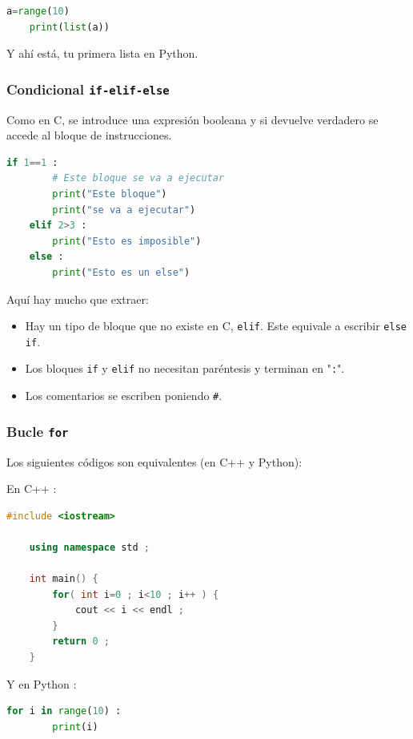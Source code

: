 \documentclass[openany,a4paper]{book}
\begin{document}
\begin{lstlisting}[language=Python]
    a=range(10)
    print(list(a))
\end{lstlisting}

Y ahí está, tu primera lista en Python.

\subsubsection{Condicional \texttt{if-elif-else}}

Como en C, se introduce una expresión booleana y si devuelve verdadero se accede al bloque de instrucciones.

\begin{lstlisting}[language=Python]
    if 1==1 :
        # Este bloque se va a ejecutar
        print("Este bloque")
        print("se va a ejecutar")
    elif 2>3 :
        print("Esto es imposible")
    else :
        print("Esto es un else")
\end{lstlisting}

Aquí hay mucho que extraer:
\begin{itemize}
    \item Hay un tipo de bloque que no existe en C, \texttt{elif}. Este equivale a escribir \texttt{else if}.
    \item Los bloques \texttt{if} y \texttt{elif} no necesitan paréntesis y terminan en "\texttt{:}".
    \item Los comentarios se escriben poniendo \texttt{\#}.
\end{itemize}


\subsubsection{Bucle \texttt{for}}

Los siguientes códigos son equivalentes (en C++ y Python):

En C++ :
\begin{lstlisting}[language=C++]
    #include <iostream>
    
    using namespace std ;
    
    int main() {
        for( int i=0 ; i<10 ; i++ ) {
            cout << i << endl ;
        }
        return 0 ;
    }
\end{lstlisting}

Y en Python :

\begin{lstlisting}[language=Python]
    for i in range(10) :
        print(i)
\end{lstlisting}
\end{document}
